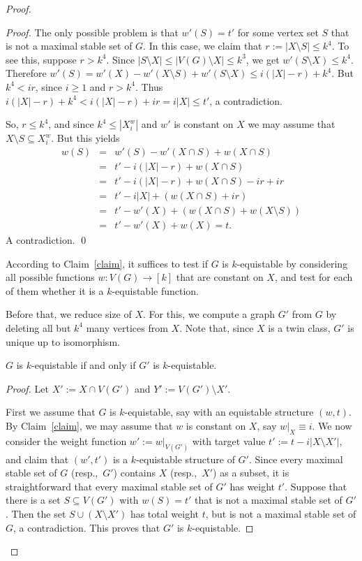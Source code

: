 \documentclass{llncs}
\begin{document}
\begin{proof}
\begin{proof}
The only possible problem is that $w'(S) = t'$ for some vertex set $S$ that is not a maximal stable set of $G$.
In this case, we claim that $r := |X \setminus S| \le k^4$. To see this, suppose $r > k^4$. 
Since  $|S\setminus X|\le |V(G)\setminus X|\le k^3$, we get $w'(S\setminus X)\le k^4$.
Therefore 
$w'(S) =w'(X)-w'(X\setminus S) + w'(S\setminus X)\le i(|X|-r)+ k^4$.
But $k^4 < ir$, since $i \ge 1$ and $r > k^4$. Thus
$i(|X|-r) + k^4 <  i(|X|-r) + ir = i|X| \le t'$, a contradiction.

So, $r \le k^4$, and since $k^4\le |X^w_i|$ and $w'$ is constant on $X$ we may assume that
$X \setminus S \subseteq X^w_i$. But this yields
\begin{eqnarray*}
w(S) &=& w'(S) - w'(X \cap S) + w(X \cap S)\\
&=& t' - i(|X|-r) + w(X \cap S)\\
&=& t' - i(|X|-r) + w(X \cap S) - ir + ir\\
&=& t' - i|X| + (w(X \cap S) + ir)\\
&=& t' - w'(X) + (w(X \cap S) + w(X \setminus S))\\
&=& t' - w'(X) + w(X) = t.
\end{eqnarray*}
A contradiction.
\qed \end{proof}

According to Claim~\ref{claim}, it suffices to test if $G$ is $k$-equistable by
considering all possible functions $w:V(G)\to [k]$ that are constant on $X$, and test for each of them whether it is a $k$-equistable function.

Before that, we reduce size of $X$.
For this, we compute a graph $G'$ from $G$ by deleting all but $k^4$ many vertices from $X$.
Note that, since $X$ is a twin class, $G'$ is unique up to isomorphism.

\begin{Claim}\label{clm:G-vs-G-prime}
$G$ is $k$-equistable if and only if $G'$ is $k$-equistable.
\end{Claim}

\begin{proof}
Let $X' := X \cap V(G')$ and $Y' := V(G')\setminus X'$.

First we assume that $G$ is $k$-equistable, say with an equistable structure $(w,t)$.
By Claim~\ref{claim}, we may assume that $w$ is constant on $X$, say $w|_X \equiv i$.
We now consider the weight function $w' := w|_{V(G')}$ with target value $t':=t-i|X \setminus X'|$, and claim that $(w',t')$ is a $k$-equistable structure of $G'$.
Since every maximal stable set of $G$ (resp.,~$G'$) contains $X$ (resp.,~$X'$) as a subset,
it is straightforward that every maximal stable set of $G'$ has weight $t'$.
Suppose that there is a set $S \subseteq V(G')$ with $w(S)=t'$ that is not a maximal stable set of $G'$.
Then the set $S \cup (X\setminus X')$ has total weight $t$, but is not a maximal stable set of $G$, a contradiction.
This proves that $G'$ is $k$-equistable.


\end{proof}
\end{proof}
\end{document}
